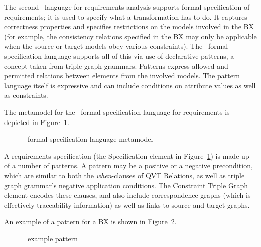 The second \transml\ language for requirements analysis supports formal specification of requirements; it is used to specify what a transformation has to do. It captures correctness properties and specifies restrictions on the models involved in the BX (for example, the consistency relations specified in the BX may only be applicable when the source or target models obey various constraints). The \transml\  formal specification language supports all of this via use of declarative patterns, a concept taken from triple graph grammars. Patterns express allowed and permitted relations between elements from the involved models. The pattern language itself is expressive and can include conditions on attribute values as well as constraints.

The metamodel for the \transml\ formal specification language for requirements is depicted in Figure~\ref{fig:transml-formal-language}.

\begin{figure}[htbp]
\caption{\transml\ formal specification language metamodel \cite{GuerraLKPS13}}
\label{fig:transml-formal-language}
\end{figure}

A requirements specification (the Specification element in Figure~\ref{fig:transml-formal-language}) is made up of a number of patterns. A pattern may be a positive or a negative precondition, which are similar to both the \textit{when}-clauses of QVT Relations, as well as triple graph grammar's negative application conditions. The Constraint Triple Graph element encodes these clauses, and also include correspondence graphs (which is effectively traceability information) as well as links to source and target graphs. 

An example of a pattern for a BX is shown in Figure~\ref{fig:transml-pattern}. 

\begin{figure}[htbp]
\caption{\transml\ example pattern \cite{GuerraLKPS13}}
\label{fig:transml-pattern}
\end{figure}

